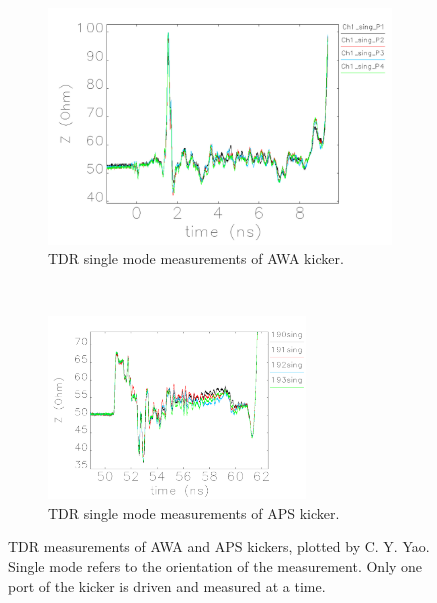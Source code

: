 \begin{figure}
	\centering
	\begin{subfigure}{0.75\textwidth}
		\centering
		\includegraphics[width=\textwidth]{./images/TDR_AWA_kicker}
		\caption{TDR single mode measurements of AWA kicker.}
		\label{fig:AWA-kicker}
	\end{subfigure}
	~%
	\begin{subfigure}{\textwidth}
		\centering
		\includegraphics[width=0.75\textwidth]{./images/TDR_APS_kicker}
		\caption{TDR single mode measurements of APS kicker.}
		\label{fig:APS-kicker}
	\end{subfigure}
	\caption{TDR measurements of AWA and APS kickers, plotted by C. Y. Yao. 
	Single mode refers to the orientation of the measurement. 
	Only one port of the kicker is driven and measured at a time. 
	}\label{fig:TDR}
\end{figure}


